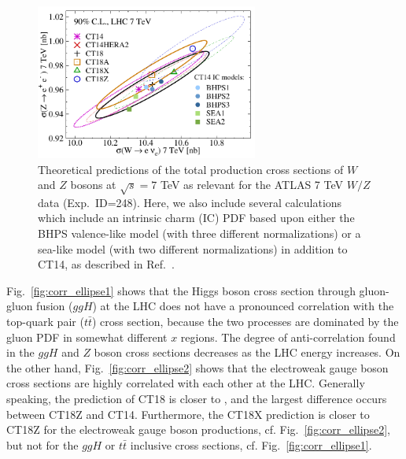 \begin{figure}[tb]
	\begin{center}
		\includegraphics[width=0.65\textwidth]{./fig/sec6/cor_tel_ct18s_W-Z__7TeV_shifted_IC_TH.pdf}
	\end{center}
	\vspace{-2ex}
	\caption{Theoretical predictions of the total production cross sections of $W$ and $Z$ bosons
	at $\sqrt{s}=7$ TeV as relevant for the ATLAS 7 TeV $W/Z$ data (Exp.~ID=248).  Here, we also
	include several calculations which include an intrinsic charm (IC) PDF based upon either
	the BHPS valence-like model (with three different normalizations) or a sea-like model (with
	two different normalizations) in addition to CT14, as described in Ref.~\cite{Hou:2017khm}.
		\label{fig:IC}}
\end{figure}

Fig.~\ref{fig:corr_ellipse1} shows that the Higgs boson cross section through
gluon-gluon fusion ($ggH$) at the LHC does not have a pronounced correlation 
with the top-quark pair ($t \bar t$) cross section, because the two processes are dominated by the gluon
PDF in somewhat different $x$ regions. 
The degree of anti-correlation found in the $ggH$ and $Z$ boson cross sections decreases as the LHC energy increases. 
On the other hand, Fig.~\ref{fig:corr_ellipse2} shows that the electroweak gauge boson cross sections are highly correlated with each other at the LHC.
Generally speaking, the prediction of CT18 is closer to \CTHERAII, and the largest difference occurs between CT18Z and CT14. 
Furthermore, the CT18X prediction is closer to CT18Z for the electroweak gauge boson productions, cf. Fig.~\ref{fig:corr_ellipse2}, but not for the $ggH$ or $t \bar t$ inclusive cross sections, cf. Fig.~\ref{fig:corr_ellipse1}.


